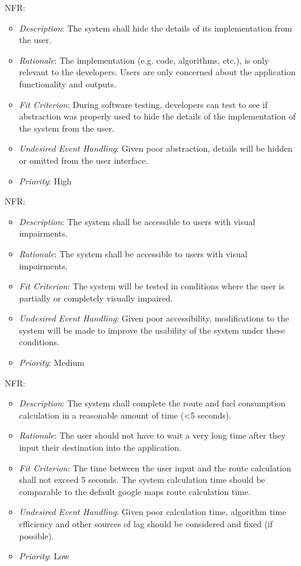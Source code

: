 \documentclass[12pt]{article}
\newcounter{nfrnum} %
\begin{document}
\begin{itemize}
\item[NFR\refstepcounter{nfrnum}\thenfrnum \label{NFR_6}:] 
\begin{itemize}
  \item \textit{Description}: The system shall hide the details of its implementation from the user.
  \item \textit{Rationale}: The implementation (e.g. code, algorithms, etc.), is only relevant to the developers. Users are only concerned about the application functionality and outputs.
  \item \textit{Fit Criterion}: During software testing, developers can test to see if abstraction was properly used to hide the details of the implementation of the system from the user.  
  \item \textit{Undesired Event Handling}: Given poor abstraction, details will be hidden or omitted from the user interface. 
  \item \textit{Priority}: High
\end{itemize}

\item[NFR\refstepcounter{nfrnum}\thenfrnum \label{NFR_7}:] 
\begin{itemize}
  \item \textit{Description}: The system shall be accessible to users with visual impairments. 
  \item \textit{Rationale}: The system shall be accessible to users with visual impairments. 
  \item \textit{Fit Criterion}: The system will be tested in conditions where the user is partially or completely visually impaired. 
  \item \textit{Undesired Event Handling}: Given poor accessibility, modifications to the system will be made to improve the usability of the system under these conditions.
  \item \textit{Priority}: Medium
\end{itemize}

\item[NFR\refstepcounter{nfrnum}\thenfrnum \label{NFR_8}:] 
\begin{itemize}
  \item \textit{Description}: The system shall complete the route and fuel consumption calculation in a reasonable amount of time (<5 seconds). 
  \item \textit{Rationale}: The user should not have to wait a very long time after they input their destination into the application.
  \item \textit{Fit Criterion}: The time between the user input and the route calculation shall not exceed 5 seconds. The system calculation time should be comparable to the default google maps route calculation time.  
  \item \textit{Undesired Event Handling}: Given poor calculation time, algorithm time efficiency and other sources of lag should be considered and fixed (if possible). 
  \item \textit{Priority}: Low
\end{itemize}


\end{itemize}
\end{document}
